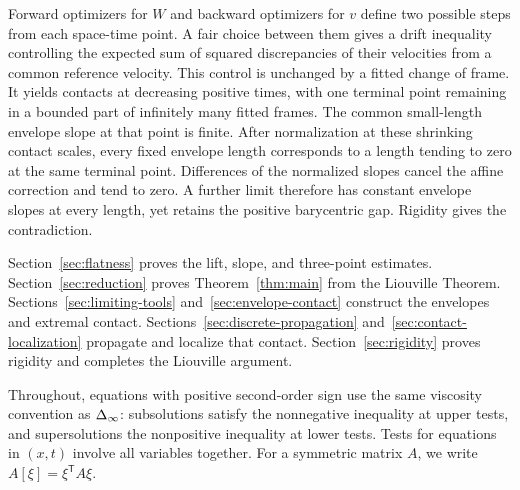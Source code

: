 Forward optimizers for $W$ and backward optimizers for $v$ define two
possible steps from each space-time point. A fair choice between them
gives a drift inequality controlling the expected sum of squared discrepancies
of their velocities from a common reference velocity. This control is
unchanged by a fitted change of frame. It yields contacts at decreasing
positive times, with one terminal point remaining in a bounded part of
infinitely many fitted frames. The common small-length envelope slope at
that point is finite. After normalization at these shrinking contact
scales, every fixed envelope length corresponds to a length tending to zero
at the same terminal point. Differences of the normalized slopes cancel
the affine correction and tend to zero. A further limit therefore has
constant envelope slopes at every length, yet retains the positive
barycentric gap.
Rigidity gives the contradiction.

Section~\ref{sec:flatness} proves the lift, slope, and three-point estimates.
Section~\ref{sec:reduction} proves Theorem~\ref{thm:main} from the
Liouville Theorem. Sections~\ref{sec:limiting-tools}
and~\ref{sec:envelope-contact} construct the envelopes and extremal contact.
Sections~\ref{sec:discrete-propagation}
and~\ref{sec:contact-localization} propagate and localize that contact.
Section~\ref{sec:rigidity} proves rigidity and completes the Liouville
argument.

Throughout, equations with positive second-order sign use the same
viscosity convention as $\Delta_{\infty}$: subsolutions satisfy the nonnegative
inequality at upper tests, and supersolutions the nonpositive inequality
at lower tests. Tests for equations in $(x,t)$ involve all variables
together. For a symmetric matrix $A$, we write $A[\xi]=\xi^{\mathsf T}A\xi$.
